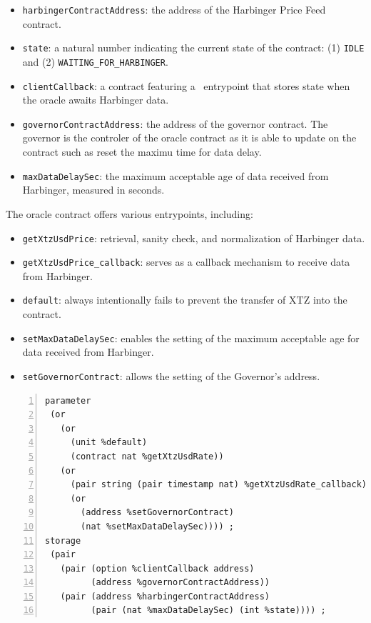 \documentclass[a4paper,USenglish,cleveref, autoref, thm-restate]{lipics-v2021}
\begin{document}
\begin{itemize}
\item \lstinline/harbingerContractAddress/: the address of the Harbinger Price Feed contract.
 \item    \lstinline/state/: a natural number indicating the current state of the contract: (1) \lstinline/IDLE/ and (2) \lstinline/WAITING_FOR_HARBINGER/.
 \item    \lstinline/clientCallback/: a contract featuring a \TNAT\ entrypoint that stores state when the oracle awaits Harbinger data.
 \item    \lstinline/governorContractAddress/: the address of the governor contract. The governor is the controler of the oracle contract as it is able to update on the contract such as reset the maximu time for data delay.  
 \item    \lstinline/maxDataDelaySec/: the maximum acceptable age of data received from Harbinger, measured in seconds.
\end{itemize}
The oracle contract offers various entrypoints, including:
\begin{itemize}
\item    \lstinline/getXtzUsdPrice/: retrieval, sanity check, and normalization of Harbinger data.
\item    \lstinline/getXtzUsdPrice_callback/: serves as a callback mechanism to receive data from Harbinger.
\item    \lstinline/default/: always intentionally fails to prevent the transfer of XTZ into the contract.
\item    \lstinline/setMaxDataDelaySec/: enables the setting of the maximum acceptable age for data received from Harbinger.
\item    \lstinline/setGovernorContract/: allows the setting of the Governor's address.
\end{itemize}

\begin{lstlisting}[float,captionpos=b,caption={Kolibri oracle contract},label={lst:kolibri-oracle-contract},numbers=left]
parameter
 (or
   (or
     (unit %default)
     (contract nat %getXtzUsdRate))
   (or
     (pair string (pair timestamp nat) %getXtzUsdRate_callback)
     (or
       (address %setGovernorContract)
       (nat %setMaxDataDelaySec)))) ;
storage
 (pair
   (pair (option %clientCallback address) 
         (address %governorContractAddress))
   (pair (address %harbingerContractAddress) 
         (pair (nat %maxDataDelaySec) (int %state)))) ;
\end{lstlisting}
\end{document}
